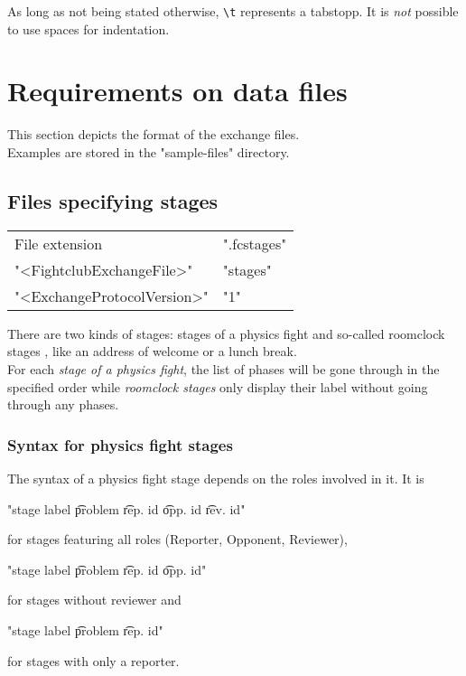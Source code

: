 \documentclass[11pt]{ltxdoc}
\def\highlight#1{%
    \colorbox{red!12}{#1}%
    \index{\textsf{#1}}}
\begin{document}
    \medskip
    As long as not being stated otherwise, \highlight{\texttt{\textbackslash t}} represents a tabstopp. It is \textit{not} possible to use spaces for indentation.
    
    
    
    
    
    \section{Requirements on data files}
    This section depicts the format of the exchange files. \\
    Examples are stored in the "sample-files" directory.
    
    
    \subsection{Files specifying stages}
    \begin{center}
        \begin{tabular}{ll}
            File extension & ".fcstages" \\
            "<FightclubExchangeFile>" & "stages" \\
            "<ExchangeProtocolVersion>" & "1"
        \end{tabular}
    \end{center}
    
    
    There are two kinds of stages: stages of a physics fight and so-called \highlight{roomclock stages}, like an address of welcome or a lunch break. \\
    For each \textit{stage of a physics fight}, the list of phases will be gone through in the specified order while \textit{roomclock stages} only display their label without going through any phases.

    
    \subsubsection*{Syntax for physics fight stages}
    The syntax of a physics fight stage depends on the roles involved in it. It is
    \begin{center}
        "stage label  \t  problem  \t  rep. id  \t  opp. id  \t  rev. id"
    \end{center}
    for stages featuring all roles (Reporter, Opponent, Reviewer),
    \begin{center}
        "stage label  \t  problem  \t  rep. id  \t  opp. id"
    \end{center}
    for stages without reviewer and
    \begin{center}
        "stage label  \t  problem  \t  rep. id"
    \end{center}
    for stages with only a reporter.
    
\end{document}
